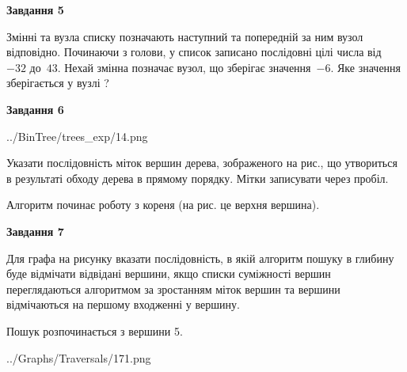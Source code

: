 \documentclass[12pt, ukrainian]{article}
\begin{document}
{\begin {large}
{\begin {center}\textbf{Завдання 5}\end {center}}\par
Змінні  та  вузла списку позначають наступний та попередній за ним вузол відповідно. Починаючи з голови, у список записано послідовні цілі числа від~$-32$ до~$43$. Нехай змінна  позначає вузол, що зберігає значення~$-6$.
Яке значення зберігається у вузлі  ?\par
\newpage

{\begin {center}\textbf{Завдання 6}\end {center}}\par

\begin{center}
	{../BinTree/trees_exp/14.png}
\end{center}
Указати послідовність міток вершин дерева, зображеного на рис., що утвориться в результаті обходу дерева в прямому порядку. Мітки записувати через пробіл.\par Алгоритм починає роботу з кореня (на рис. це верхня вершина).\par
\newpage

{\begin {center}\textbf{Завдання 7}\end {center}}\par
Для графа на рисунку вказати послідовність, в якій алгоритм пошуку в глибину буде відмічати відвідані вершини, якщо списки суміжності вершин переглядаються алгоритмом за зростанням міток вершин та вершини відмічаються на першому вход\-женні у вершину.\par
Пошук розпочинається з вершини 5.\par

\begin{center}
	{../Graphs/Traversals/171.png}
\end{center}\par
\newpage


\end{large}}
\end{document}
